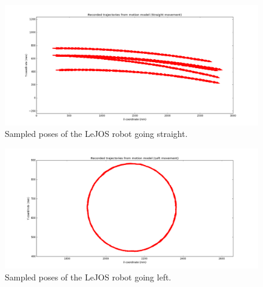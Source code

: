 \documentclass[paper=a4, fontsize=11pt]{scrartcl} %
\begin{document}
    \begin{figure}[h!]
        \begin{center}
            \setlength{\fboxsep}{0.5pt} %
            \setlength{\fboxrule}{0.5pt}
            \includegraphics[width=\linewidth,fbox]{images/raw_straight.png}
            \caption{Sampled poses of the LeJOS robot going straight.}
        \end{center}
    \end{figure}

    \begin{figure}[h!]
        \begin{center}
            \setlength{\fboxsep}{0.5pt} %
            \setlength{\fboxrule}{0.5pt}
            \includegraphics[width=\linewidth,fbox]{images/raw_left.png}
            \caption{Sampled poses of the LeJOS robot going left.}
        \end{center}
    \end{figure}
\end{document}
